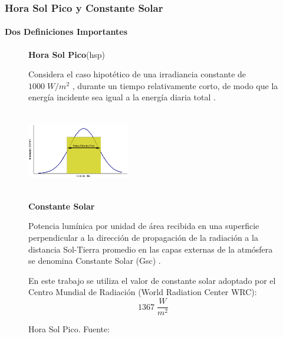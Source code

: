 \documentclass{beamer}
\begin{document}
\begin{frame}
   \frametitle{Hora Sol Pico y Constante Solar}
   \framesubtitle{Dos Definiciones Importantes}
   \begin{figure}
      \begin{minipage}{0.4\textwidth}
         \textbf{Hora Sol Pico}(hsp) \par
         \vspace{0.5 cm}
         \scriptsize Considera el caso hipotético de una irradiancia constante de $1000 \; W/m^2$ , durante un tiempo relativamente corto, de modo 
         que la energía incidente sea igual a la energía diaria total \cite{hora_sol_pico}.\par 
         \centering \includegraphics[width=4.5cm, height=3.5cm]{hora_sol_pico}
         \caption{\tiny Hora Sol Pico. Fuente: }
      \end{minipage}
      \hspace{0.5cm} 
      \begin{minipage}{0.4\textwidth}
         \textbf{Constante Solar} \par
         \vspace{0.5 cm}
         \scriptsize Potencia lumínica por unidad de área recibida en una superficie perpendicular a la dirección de propagación de la radiación a la
         distancia Sol-Tierra promedio en las capas externas de la atmósfera se denomina Constante Solar (Gsc) \cite{johnson1954solar}. \par
         En este trabajo se utiliza el valor de constante solar adoptado por el  Centro Mundial de Radiación (World Radiation Center WRC):  
         $$1367 \; \frac{W}{m^2}$$
      \end{minipage}
   \end{figure}
\end{frame}

\end{document}
